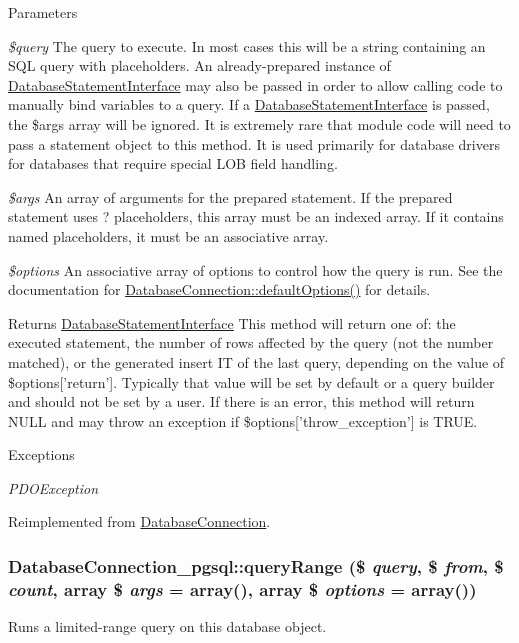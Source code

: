 \begin{DoxyParams}{Parameters}
\item[{\em \$query}]The query to execute. In most cases this will be a string containing an SQL query with placeholders. An already-\/prepared instance of \hyperlink{interfaceDatabaseStatementInterface}{DatabaseStatementInterface} may also be passed in order to allow calling code to manually bind variables to a query. If a \hyperlink{interfaceDatabaseStatementInterface}{DatabaseStatementInterface} is passed, the \$args array will be ignored. It is extremely rare that module code will need to pass a statement object to this method. It is used primarily for database drivers for databases that require special LOB field handling. \item[{\em \$args}]An array of arguments for the prepared statement. If the prepared statement uses ? placeholders, this array must be an indexed array. If it contains named placeholders, it must be an associative array. \item[{\em \$options}]An associative array of options to control how the query is run. See the documentation for \hyperlink{classDatabaseConnection_a190539d6c494ef2d7ac90d21226de5a5}{DatabaseConnection::defaultOptions()} for details.\end{DoxyParams}
\begin{DoxyReturn}{Returns}
\hyperlink{interfaceDatabaseStatementInterface}{DatabaseStatementInterface} This method will return one of: the executed statement, the number of rows affected by the query (not the number matched), or the generated insert IT of the last query, depending on the value of \$options\mbox{[}'return'\mbox{]}. Typically that value will be set by default or a query builder and should not be set by a user. If there is an error, this method will return NULL and may throw an exception if \$options\mbox{[}'throw\_\-exception'\mbox{]} is TRUE.
\end{DoxyReturn}

\begin{DoxyExceptions}{Exceptions}
\item[{\em PDOException}]\end{DoxyExceptions}


Reimplemented from \hyperlink{classDatabaseConnection_aff564097281c4496e9d10cb1bccbe98d}{DatabaseConnection}.\hypertarget{classDatabaseConnection__pgsql_aabdd2246a4122962112ff37ab080eee7}{
\subsubsection[{queryRange}]{\setlength{\rightskip}{0pt plus 5cm}DatabaseConnection\_\-pgsql::queryRange (\$ {\em query}, \/  \$ {\em from}, \/  \$ {\em count}, \/  array \$ {\em args} = {\ttfamily array()}, \/  array \$ {\em options} = {\ttfamily array()})}}
\label{classDatabaseConnection__pgsql_aabdd2246a4122962112ff37ab080eee7}
Runs a limited-\/range query on this database object.

